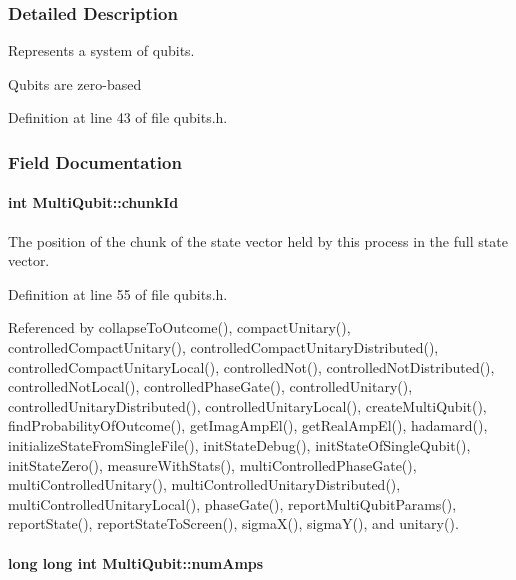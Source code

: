 \subsubsection{Detailed Description}
Represents a system of qubits. 

Qubits are zero-\/based 

Definition at line 43 of file qubits.\+h.



\subsubsection{Field Documentation}
\paragraph[{\texorpdfstring{chunk\+Id}{chunkId}}]{\setlength{\rightskip}{0pt plus 5cm}int Multi\+Qubit\+::chunk\+Id}\hypertarget{structMultiQubit_ab10c88249fa3825d6227ceec01d37e37}{}\label{structMultiQubit_ab10c88249fa3825d6227ceec01d37e37}


The position of the chunk of the state vector held by this process in the full state vector. 



Definition at line 55 of file qubits.\+h.



Referenced by collapse\+To\+Outcome(), compact\+Unitary(), controlled\+Compact\+Unitary(), controlled\+Compact\+Unitary\+Distributed(), controlled\+Compact\+Unitary\+Local(), controlled\+Not(), controlled\+Not\+Distributed(), controlled\+Not\+Local(), controlled\+Phase\+Gate(), controlled\+Unitary(), controlled\+Unitary\+Distributed(), controlled\+Unitary\+Local(), create\+Multi\+Qubit(), find\+Probability\+Of\+Outcome(), get\+Imag\+Amp\+El(), get\+Real\+Amp\+El(), hadamard(), initialize\+State\+From\+Single\+File(), init\+State\+Debug(), init\+State\+Of\+Single\+Qubit(), init\+State\+Zero(), measure\+With\+Stats(), multi\+Controlled\+Phase\+Gate(), multi\+Controlled\+Unitary(), multi\+Controlled\+Unitary\+Distributed(), multi\+Controlled\+Unitary\+Local(), phase\+Gate(), report\+Multi\+Qubit\+Params(), report\+State(), report\+State\+To\+Screen(), sigma\+X(), sigma\+Y(), and unitary().

\paragraph[{\texorpdfstring{num\+Amps}{numAmps}}]{\setlength{\rightskip}{0pt plus 5cm}long long int Multi\+Qubit\+::num\+Amps}\hypertarget{structMultiQubit_ae16f47d8b725c914fb7f66b6498d79db}{}\label{structMultiQubit_ae16f47d8b725c914fb7f66b6498d79db}


